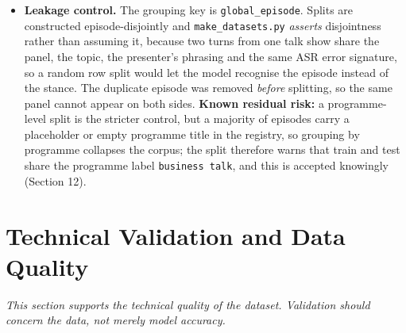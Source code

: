\documentclass[11pt,a4paper]{article}
\begin{document}
\begin{itemize}[leftmargin=1.4em,itemsep=3pt,topsep=2pt]
        Speaker IDs are model predictions, not person identities.
  \item \textbf{Leakage control.} The grouping key is \texttt{global\_episode}. Splits are
        constructed episode-disjointly and \texttt{make\_datasets.py} \emph{asserts} disjointness
        rather than assuming it, because two turns from one talk show share the panel, the topic,
        the presenter's phrasing and the same ASR error signature, so a random row split would let
        the model recognise the episode instead of the stance. The duplicate episode was removed
        \emph{before} splitting, so the same panel cannot appear on both sides.
        \textbf{Known residual risk:} a programme-level split is the stricter control, but a
        majority of episodes carry a placeholder or empty programme title in the registry, so
        grouping by programme collapses the corpus; the split therefore warns that train and test share the programme
        label \texttt{business talk}, and this is accepted knowingly (Section 12).
\end{itemize}

\section{Technical Validation and Data Quality}

\emph{\small This section supports the technical quality of the dataset. Validation should concern
the data, not merely model accuracy.}
\end{document}
